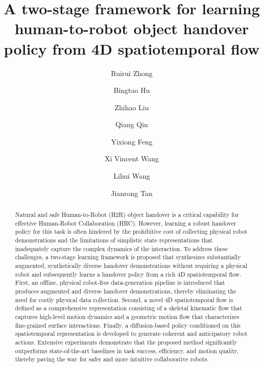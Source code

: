 \documentclass[final,5p,times,twocolumn]{elsarticle}
\begin{document}
\begin{frontmatter}

\title{A two-stage framework for learning human-to-robot object handover policy from 4D spatiotemporal flow}

\author[aff1,aff2]{Ruirui Zhong}
\author[aff1]{Bingtao Hu }
\author[aff2]{Zhihao Liu}
\author[aff2]{Qiang Qin}
\author[aff1,aff3]{Yixiong Feng}
\author[aff2]{Xi Vincent Wang }
\author[aff2]{Lihui Wang}
\author[aff1]{Jianrong Tan}





\begin{abstract}
Natural and safe Human-to-Robot (H2R) object handover is a critical capability for effective Human-Robot Collaboration (HRC). However, learning a robust handover policy for this task is often hindered by the prohibitive cost of collecting physical robot demonstrations and the limitations of simplistic state representations that inadequately capture the complex dynamics of the interaction. To address these challenges, a two-stage learning framework is proposed that synthesizes substantially augmented, synthetically diverse handover demonstrations without requiring a physical robot and subsequently learns a handover policy from a rich 4D spatiotemporal flow. First, an offline, physical robot-free data-generation pipeline is introduced that produces augmented and diverse handover demonstrations, thereby eliminating the need for costly physical data collection. Second, a novel 4D spatiotemporal flow is defined as a comprehensive representation consisting of a skeletal kinematic flow that captures high-level motion dynamics and a geometric motion flow that characterizes fine-grained surface interactions. Finally, a diffusion-based policy conditioned on this spatiotemporal representation is developed to generate coherent and anticipatory robot actions. Extensive experiments demonstrate that the proposed method significantly outperforms state-of-the-art baselines in task success, efficiency, and motion quality, thereby paving the way for safer and more intuitive collaborative robots.
\end{abstract}


\end{frontmatter}
\end{document}
